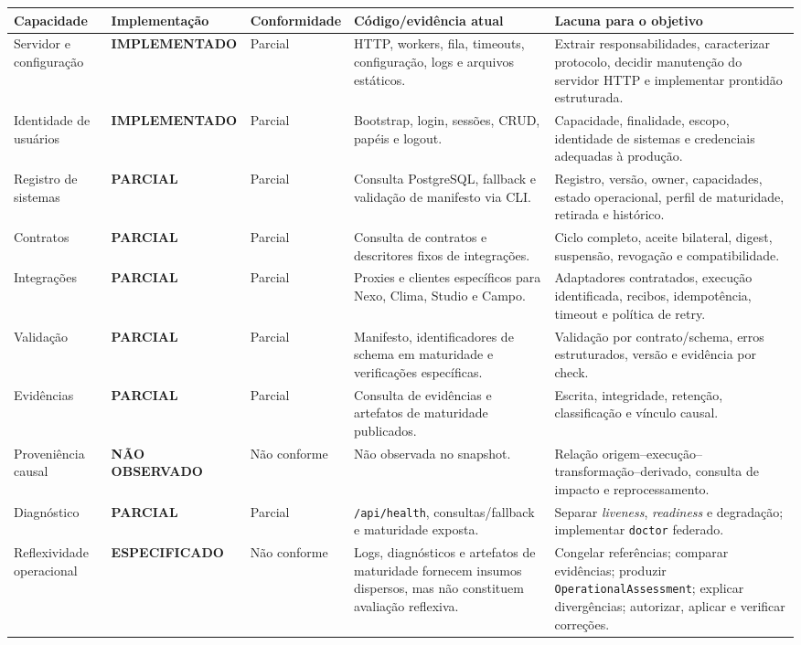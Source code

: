 \documentclass[11pt,a4paper,oneside]{article}
\newcommand{\statusimpl}{\textcolor{sistergreen}{\textbf{IMPLEMENTADO}}}
\newcommand{\statusparcial}{\textcolor{sisteramber}{\textbf{PARCIAL}}}
\newcommand{\statusespec}{\textcolor{sisterblue}{\textbf{ESPECIFICADO}}}
\newcommand{\statusausente}{\textcolor{sisterred}{\textbf{NÃO OBSERVADO}}}
\begin{document}
\begin{landscape}
\scriptsize
\begin{longtable}{P{3.2cm}P{3.0cm}P{2.5cm}P{5.1cm}P{5.6cm}}
\toprule
\textbf{Capacidade} & \textbf{Implementação} & \textbf{Conformidade} & \textbf{Código/evidência atual} & \textbf{Lacuna para o objetivo} \\
\midrule
\endhead
Servidor e configuração & \statusimpl & Parcial & HTTP, workers, fila, timeouts, configuração, logs e arquivos estáticos. & Extrair responsabilidades, caracterizar protocolo, decidir manutenção do servidor HTTP e implementar prontidão estruturada. \\
Identidade de usuários & \statusimpl & Parcial & Bootstrap, login, sessões, CRUD, papéis e logout. & Capacidade, finalidade, escopo, identidade de sistemas e credenciais adequadas à produção. \\
Registro de sistemas & \statusparcial & Parcial & Consulta PostgreSQL, fallback e validação de manifesto via CLI. & Registro, versão, owner, capacidades, estado operacional, perfil de maturidade, retirada e histórico. \\
Contratos & \statusparcial & Parcial & Consulta de contratos e descritores fixos de integrações. & Ciclo completo, aceite bilateral, digest, suspensão, revogação e compatibilidade. \\
Integrações & \statusparcial & Parcial & Proxies e clientes específicos para Nexo, Clima, Studio e Campo. & Adaptadores contratados, execução identificada, recibos, idempotência, timeout e política de retry. \\
Validação & \statusparcial & Parcial & Manifesto, identificadores de schema em maturidade e verificações específicas. & Validação por contrato/schema, erros estruturados, versão e evidência por check. \\
Evidências & \statusparcial & Parcial & Consulta de evidências e artefatos de maturidade publicados. & Escrita, integridade, retenção, classificação e vínculo causal. \\
Proveniência causal & \statusausente & Não conforme & Não observada no snapshot. & Relação origem--execução--transformação--derivado, consulta de impacto e reprocessamento. \\
Diagnóstico & \statusparcial & Parcial & \texttt{/api/health}, consultas/fallback e maturidade exposta. & Separar \textit{liveness}, \textit{readiness} e degradação; implementar \texttt{doctor} federado. \\
Reflexividade operacional & \statusespec & Não conforme & Logs, diagnósticos e artefatos de maturidade fornecem insumos dispersos, mas não constituem avaliação reflexiva. & Congelar referências; comparar evidências; produzir \texttt{OperationalAssessment}; explicar divergências; autorizar, aplicar e verificar correções. \\

\end{longtable}
\end{landscape}
\end{document}
